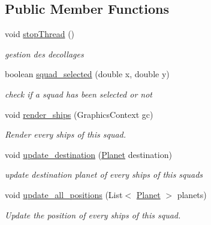 \subsection*{Public Member Functions}
\begin{DoxyCompactItemize}
\item 
void \mbox{\hyperlink{classfr_1_1groupe40_1_1projet_1_1model_1_1ships_1_1_squad_abd0c5c3ff45d693cf207734d54879fda}{stop\+Thread}} ()
\begin{DoxyCompactList}\small\item\em gestion des decollages \end{DoxyCompactList}\item 
boolean \mbox{\hyperlink{classfr_1_1groupe40_1_1projet_1_1model_1_1ships_1_1_squad_a16258df054fffdf1acb534665f4d14f4}{squad\+\_\+selected}} (double x, double y)
\begin{DoxyCompactList}\small\item\em check if a squad has been selected or not \end{DoxyCompactList}\item 
void \mbox{\hyperlink{classfr_1_1groupe40_1_1projet_1_1model_1_1ships_1_1_squad_ae4a39cb93983806cdb45e1edee771ecb}{render\+\_\+ships}} (Graphics\+Context gc)
\begin{DoxyCompactList}\small\item\em Render every ships of this squad. \end{DoxyCompactList}\item 
void \mbox{\hyperlink{classfr_1_1groupe40_1_1projet_1_1model_1_1ships_1_1_squad_a3aa04cec78a61156de500c0ffe244745}{update\+\_\+destination}} (\mbox{\hyperlink{classfr_1_1groupe40_1_1projet_1_1model_1_1planets_1_1_planet}{Planet}} destination)
\begin{DoxyCompactList}\small\item\em update destination planet of every ships of this squads \end{DoxyCompactList}\item 
\mbox{\label{classfr_1_1groupe40_1_1projet_1_1model_1_1ships_1_1_squad_a19aab0462859c2b4d3f3e4f7eba55fb0}} 
void \mbox{\hyperlink{classfr_1_1groupe40_1_1projet_1_1model_1_1ships_1_1_squad_a19aab0462859c2b4d3f3e4f7eba55fb0}{update\+\_\+all\+\_\+positions}} (List$<$ \mbox{\hyperlink{classfr_1_1groupe40_1_1projet_1_1model_1_1planets_1_1_planet}{Planet}} $>$ planets)
\begin{DoxyCompactList}\small\item\em Update the position of every ships of this squad. \end{DoxyCompactList}\item 

\end{DoxyCompactItemize}
